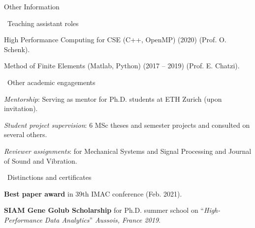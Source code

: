 \documentclass{resume_v2} %
\begin{document}
\begin{rSection}{Other Information}
  \begin{rSubsection}{\,\,\,Teaching assistant roles}{}{}{} 
    \item High Performance Computing for CSE (C++, OpenMP) (2020) (Prof. O. Schenk).
    \item Method of Finite Elements (Matlab, Python) (2017 -- 2019) (Prof. E. Chatzi).
  \end{rSubsection}
   \begin{rSubsection}{\,\,\,Other academic engagements}{}{}{}
   \item \textit{Mentorship}: Serving as mentor for Ph.D. students at ETH Zurich (upon invitation).
   \item \textit{Student project supervision}: 6 MSc theses and semester projects and consulted on several others.
  \item \textit{Reviewer assignments}: for Mechanical Systems and Signal Processing and Journal of Sound and Vibration.
  \end{rSubsection}

  \begin{rSubsection}{\,\,\,Distinctions and certificates}{}{}{}
\item {\textbf{Best paper award}} in 39th IMAC conference (Feb. 2021).
  \item \textbf{SIAM Gene Golub Scholarship} for Ph.D. summer school on ``\textit{{High-Performance Data Analytics}}'' \textit{Aussois, France 2019}.
  \end{rSubsection}

\end{rSection}
\end{document}
